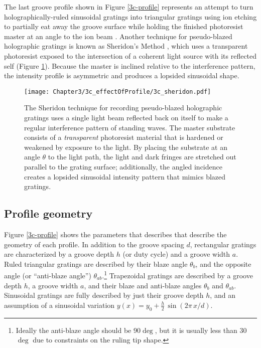 The last groove profile shown in Figure \ref{3c-profile} represents an attempt to turn holographically-ruled sinusoidal gratings into triangular gratings using ion etching to partially eat away the groove surface while holding the finished photoresist master at an angle to the ion beam \cite{Aoy76}.  Another technique for pseudo-blazed holographic gratings is known as Sheridon's Method \cite{She68}, which uses a transparent photoresist exposed to the intersection of a coherent light source with its reflected self (Figure \ref{3c-sheridon}).  Because the master is inclined relative to the interference pattern, the intensity profile is asymmetric and produces a lopsided sinusoidal shape.

\begin{figure}[htbp] %
   \centering
   \texttt{[image: Chapter3/3c\_effectOfProfile/3c\_sheridon.pdf]}
   \caption[The Sheridon technique for recording pseudo-blazed holographic gratings uses a single light beam reflected back on itself to make a regular interference pattern of standing waves.  The master substrate consists of a \emph{transparent} photoresist material that is hardened or weakened by exposure to the light.]{The Sheridon technique for recording pseudo-blazed holographic gratings uses a single light beam reflected back on itself to make a regular interference pattern of standing waves.  The master substrate consists of a \emph{transparent} photoresist material that is hardened or weakened by exposure to the light.  By placing the substrate at an angle $\theta$ to the light path, the light and dark fringes are stretched out parallel to the grating surface; additionally, the angled incidence creates a lopsided sinusoidal intensity pattern that mimics blazed gratings.}
   \label{3c-sheridon}
\end{figure}


\subsection{Profile geometry}
Figure \ref{3c-profile} shows the parameters that describes that describe the geometry of each profile.  In addition to the groove spacing $d$, rectangular gratings are characterized by a groove depth $h$ (or duty cycle) and a groove width $a$.  Ruled triangular gratings are described by their blaze angle $\theta_b$, and the opposite angle (or ``anti-blaze angle'') $\theta_{ab}$.\footnote{Ideally the anti-blaze angle should be 90$\deg$, but it is usually less than 30$\deg$ due to constraints on the ruling tip shape.}  Trapezoidal gratings are described by a groove depth $h$, a groove width $a$, and their blaze and anti-blaze angles $\theta_b$ and $\theta_{ab}$.  Sinusoidal gratings are fully described by just their groove depth $h$, and an assumption of a sinusoidal variation $y(x) = y_0 + \frac{h}{2}\, \sin(2\pi \,x / d)$.

